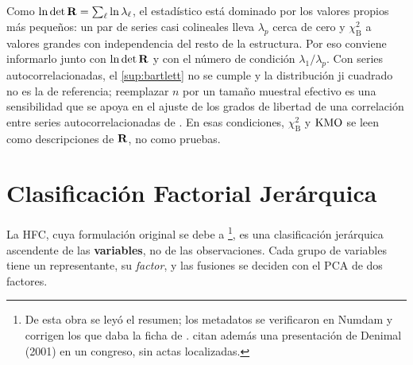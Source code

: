 \begin{observacion}\label{obs:bartlett-series}
Como $\ln\det\mathbf{R}=\sum_\ell\ln\lambda_\ell$, el estadístico está dominado por los valores propios
más pequeños: un par de series casi colineales lleva $\lambda_p$ cerca de cero y
$\chi^2_{\mathrm B}$ a valores grandes con independencia del resto de la estructura. Por eso
conviene informarlo junto con $\ln\det\mathbf{R}$ y con el número de condición
$\lambda_1/\lambda_p$. Con series autocorrelacionadas, el \cref{sup:bartlett} no se cumple y la
distribución ji cuadrado no es la de referencia; reemplazar $n$ por un tamaño muestral efectivo
es una sensibilidad que se apoya en el ajuste de los grados de libertad de una correlación entre
series autocorrelacionadas de \textcite{pyper_peterman_1998}. En esas condiciones,
$\chi^2_{\mathrm B}$ y $\operatorname{KMO}$ se leen como descripciones de $\mathbf{R}$, no como pruebas.
\end{observacion}

\section{Clasificación Factorial Jerárquica}
\label{sec:hfc}

La HFC, cuya formulación original se debe a
\textcite{denimal_2007}\footnote{De esta obra se leyó el resumen; los metadatos se verificaron en
Numdam y corrigen los que daba la ficha de \textcite{camiz_et_al_2020}. \textcite{camiz_roig_2011}
citan además una presentación de Denimal (2001) en un congreso, sin actas localizadas.
}, es una clasificación jerárquica ascendente de las
\textbf{variables}, no de las observaciones. Cada grupo de variables tiene un representante, su
\emph{factor}, y las fusiones se deciden con el PCA de dos factores.

